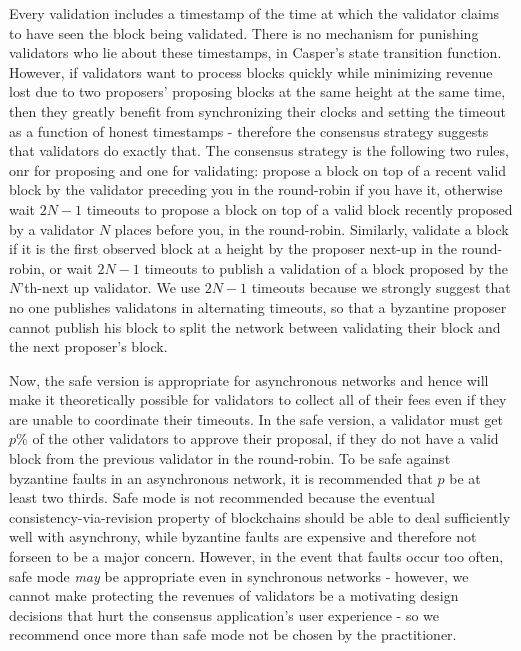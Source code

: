 \documentclass[11pt,a4paper]{article}
\begin{document}
Every validation includes a timestamp of the time at which the validator claims to have seen the block being validated. There is no mechanism for punishing validators who lie about these timestamps, in Casper's state transition function. However, if validators want to process blocks quickly while minimizing revenue lost due to two proposers' proposing blocks at the same height at the same time, then they greatly benefit from synchronizing their clocks and setting the timeout as a function of honest timestamps - therefore the consensus strategy suggests that validators do exactly that. The consensus strategy is the following two rules, onr for proposing and one for validating: propose a block on top of a recent valid block by the validator preceding you in the round-robin if you have it, otherwise wait $2N - 1$ timeouts to propose a block on top of a valid block recently proposed by a validator $N$ places before you, in the round-robin. Similarly, validate a block if it is the first observed block at a height by the proposer next-up in the round-robin, or wait $2N - 1$ timeouts to publish a validation of a block proposed by the $N$'th-next up validator. We use $2N - 1$ timeouts because we strongly suggest that no one publishes validatons in alternating timeouts, so that a byzantine proposer cannot publish his block to split the network between validating their block and the next proposer's block.

Now, the safe version is appropriate for asynchronous networks and hence will make it theoretically possible for validators to collect all of their fees even if they are unable to coordinate their timeouts. In the safe version, a validator must get $p\%$ of the other validators to approve their proposal, if they do not have a valid block from the previous validator in the round-robin. To be safe against byzantine faults in an asynchronous network, it is recommended that $p$ be at least two thirds. Safe mode is not recommended because the eventual consistency-via-revision property of blockchains should be able to deal sufficiently well with asynchrony, while byzantine faults are expensive and therefore not forseen to be a major concern. However, in the event that faults occur too often, safe mode \emph{may} be appropriate even in synchronous networks - however, we cannot make protecting the revenues of validators be a motivating design decisions that hurt the consensus application's user experience - so we recommend once more than safe mode not be chosen by the practitioner.

\end{document}
